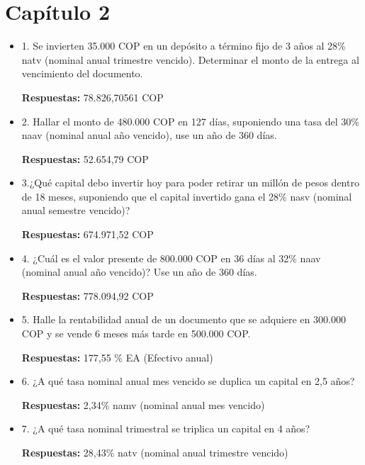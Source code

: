 \chapter*{Capítulo 2}


\begin{itemize}

 \item 1. Se invierten 35.000 COP en un depósito a término fijo de 3 años al 28\% natv (nominal anual trimestre vencido). Determinar el monto de la entrega al vencimiento del documento.
 
 \textbf{Respuestas:}  78.826,70561 COP
       \medskip

 \item 2. Hallar el monto de 480.000 COP en 127 días, suponiendo una tasa del 30\% naav (nominal anual año vencido), use un año de 360 días.
 
  \textbf{Respuestas:}  52.654,79 COP
       \medskip

 \item 3.¿Qué capital debo invertir hoy para poder retirar un millón de pesos dentro de 18 meses, suponiendo que el capital invertido gana el 28\% nasv (nominal anual semestre vencido)?
 
       \textbf{Respuestas:}  674.971,52 COP
       \medskip

 \item 4. ¿Cuál es el valor presente de 800.000 COP en 36 días al 32\% naav (nominal anual año vencido)? Use un año de 360 días.
 
       \textbf{Respuestas:}  778.094,92 COP
       \medskip

 \item 5. Halle la rentabilidad anual de un documento que se adquiere en 300.000 COP y se vende 6 meses más tarde en 500.000 COP. 
 
    \textbf{Respuestas:}  177,55 \% EA (Efectivo anual)
       \medskip

 \item 6. ¿A qué tasa nominal anual mes vencido se duplica un capital en 2,5 años?  
 
       \textbf{Respuestas:} 2,34\%  namv (nominal anual mes vencido)
       \medskip

 \item 7. ¿A qué tasa nominal trimestral se triplica un capital en 4 años?
 
       \textbf{Respuestas:} 28,43\%  natv (nominal anual trimestre vencido)
       \medskip


\end{itemize}
